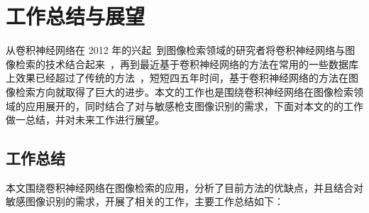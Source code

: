
\chapter{工作总结与展望}\label{chapter:conclusion}

从卷积神经网络在 2012 年的兴起~\cite{Krizhevsky2012ImageNetCW}到图像检索领域的研究者将卷积神经网络与图像检索的技术结合起来~\cite{Babenko2014NeuralCF,Gong2014MultiscaleOP}，再到最近基于卷积神经网络的方法在常用的一些数据库上效果已经超过了传统的方法~\cite{Gordo2016DeepIR,Noh2017LargeScaleIR}，短短四五年时间，基于卷积神经网络的方法在图像检索方向就取得了巨大的进步。本文的工作也是围绕卷积神经网络在图像检索领域的应用展开的，同时结合了对与敏感枪支图像识别的需求，下面对本文的的工作做一总结，并对未来工作进行展望。

\section{工作总结}
本文围绕卷积神经网络在图像检索的应用，分析了目前方法的优缺点，并且结合对敏感图像识别的需求，开展了相关的工作，主要工作总结如下：

